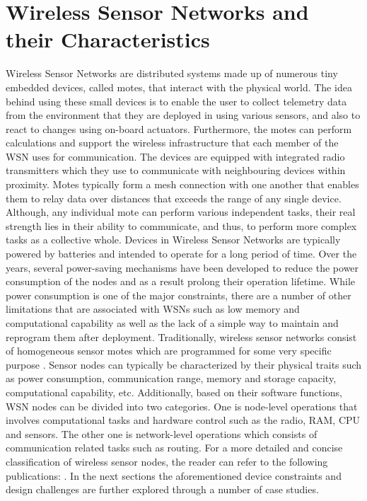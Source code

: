 \section{Wireless Sensor Networks and their Characteristics}
Wireless Sensor Networks are distributed systems made up of numerous tiny embedded devices, called motes, that interact with the physical world. The idea behind using these small devices is to enable the user to collect telemetry data from the environment that they are deployed in using various sensors, and also to react to changes using on-board actuators. Furthermore, the motes can perform calculations and support the wireless infrastructure that each member of the WSN uses for communication.  The devices are equipped with integrated radio transmitters which they use to communicate with neighbouring devices within proximity. Motes typically form a mesh connection with one another that enables them to relay data over distances that exceeds the range of any single device. Although, any individual mote can perform various independent tasks, their real strength lies in their ability to communicate, and thus, to perform more complex tasks as a collective whole. Devices in Wireless Sensor Networks are typically powered by batteries and intended to operate for a long period of time. Over the years, several power-saving mechanisms have been developed to reduce the power consumption of the nodes and as a result prolong their operation lifetime. While power consumption is one of the major constraints, there are a number of other limitations that are associated with WSNs such as low memory and computational capability as well as the lack of a simple way to maintain and reprogram them after deployment. Traditionally, wireless sensor networks consist of homogeneous sensor motes which are programmed for some very specific purpose \cite{ammari2013art,mittal2012contemporary}. 
Sensor nodes can typically be characterized by their physical traits such as power consumption, communication range, memory and storage capacity, computational capability, etc.
Additionally, based on their software functions, WSN nodes can be divided into two categories. One is node-level operations that involves computational tasks and hardware control such as the radio, RAM, CPU and sensors. The other one is network-level operations which consists of communication related tasks such as routing. For a more detailed and concise
classification of wireless sensor nodes, the reader can refer to the following publications: \cite{davis2012survey,mottola2011programming,Akyildiz2002393}.
In the next sections the aforementioned device constraints and design challenges are further explored through a number of case studies.

